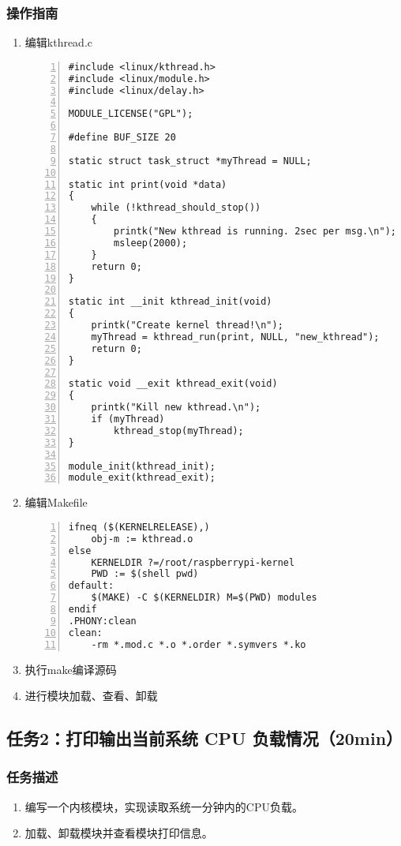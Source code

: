 \documentclass{article}
\begin{document}
\subsubsection{操作指南}
\begin{enumerate}
    \item 编辑kthread.c
\begin{lstlisting}[numbers=left]
#include <linux/kthread.h>
#include <linux/module.h>
#include <linux/delay.h>

MODULE_LICENSE("GPL");

#define BUF_SIZE 20

static struct task_struct *myThread = NULL;

static int print(void *data)
{
	while (!kthread_should_stop())
	{
		printk("New kthread is running. 2sec per msg.\n");
		msleep(2000);
	}
	return 0;
}

static int __init kthread_init(void)
{
	printk("Create kernel thread!\n");
	myThread = kthread_run(print, NULL, "new_kthread");
	return 0;
}

static void __exit kthread_exit(void)
{
	printk("Kill new kthread.\n");
	if (myThread)
		kthread_stop(myThread);
}

module_init(kthread_init);
module_exit(kthread_exit);

\end{lstlisting}
    \item 编辑Makefile
\begin{lstlisting}[numbers=left]
ifneq ($(KERNELRELEASE),)
	obj-m := kthread.o
else
	KERNELDIR ?=/root/raspberrypi-kernel
	PWD := $(shell pwd)
default:
	$(MAKE) -C $(KERNELDIR) M=$(PWD) modules
endif
.PHONY:clean
clean:
	-rm *.mod.c *.o *.order *.symvers *.ko
\end{lstlisting} 
    \item 执行make编译源码
    \item 进行模块加载、查看、卸载
\end{enumerate}

\newpage

\subsection{任务2：打印输出当前系统 CPU 负载情况（20min）}

\subsubsection{任务描述}
\begin{enumerate}
    \item 编写一个内核模块，实现读取系统一分钟内的CPU负载。
    \item 加载、卸载模块并查看模块打印信息。
\end{enumerate}
\end{document}
